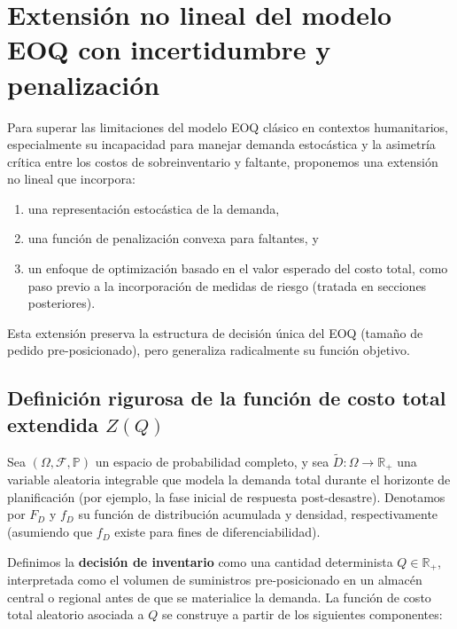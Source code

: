 \documentclass[
  spanish,
  us-letterpaper,
  DIV=11,
  numbers=noendperiod]{scrreprt}
\providecommand{\tightlist}{%
  \setlength{\itemsep}{0pt}\setlength{\parskip}{0pt}}
\numberwithin{equation}{section}
\begin{document}
\section{Extensión no lineal del modelo EOQ con incertidumbre y
penalización}\label{extensiuxf3n-no-lineal-del-modelo-eoq-con-incertidumbre-y-penalizaciuxf3n}

Para superar las limitaciones del modelo EOQ clásico en contextos
humanitarios, especialmente su incapacidad para manejar demanda
estocástica y la asimetría crítica entre los costos de sobreinventario y
faltante, proponemos una extensión no lineal que incorpora:

\begin{enumerate}
\def\labelenumi{(\roman{enumi})}
\tightlist
\item
  una representación estocástica de la demanda,
\item
  una función de penalización convexa para faltantes, y
\item
  un enfoque de optimización basado en el valor esperado del costo
  total, como paso previo a la incorporación de medidas de riesgo
  (tratada en secciones posteriores).
\end{enumerate}

Esta extensión preserva la estructura de decisión única del EOQ (tamaño
de pedido pre-posicionado), pero generaliza radicalmente su función
objetivo.

\subsection{\texorpdfstring{Definición rigurosa de la función de costo
total extendida
\(Z(Q)\)}{Definición rigurosa de la función de costo total extendida Z(Q)}}\label{definiciuxf3n-rigurosa-de-la-funciuxf3n-de-costo-total-extendida-zq}

Sea \((\Omega, \mathcal{F}, \mathbb{P})\) un espacio de probabilidad
completo, y sea \(\tilde{D}: \Omega \to \mathbb{R}_{+}\) una variable
aleatoria integrable que modela la demanda total durante el horizonte de
planificación (por ejemplo, la fase inicial de respuesta post-desastre).
Denotamos por \(F_D\) y \(f_D\) su función de distribución acumulada y
densidad, respectivamente (asumiendo que \(f_D\) existe para fines de
diferenciabilidad).

Definimos la \textbf{decisión de inventario} como una cantidad
determinista \(Q \in \mathbb{R}_{+}\), interpretada como el volumen de
suministros pre-posicionado en un almacén central o regional antes de
que se materialice la demanda. La función de costo total aleatorio
asociada a \(Q\) se construye a partir de los siguientes componentes:
\end{document}
